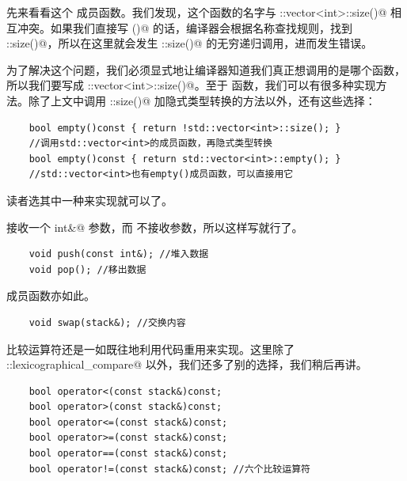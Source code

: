 先来看看这个 \lstinline@size@ 成员函数。我们发现，这个函数的名字与 \lstinline@std::vector<int>::size()@ 相互冲突。如果我们直接写 \lstinline@size()@ 的话，编译器会根据名称查找规则，找到 \lstinline@stack::size()@，所以在这里就会发生 \lstinline@stack::size()@ 的无穷递归调用，进而发生错误。\par
为了解决这个问题，我们必须显式地让编译器知道我们真正想调用的是哪个函数，所以我们要写成 \lstinline@std::vector<int>::size()@。至于 \lstinline@empty@ 函数，我们可以有很多种实现方法。除了上文中调用 \lstinline@stack::size()@ 加隐式类型转换的方法以外，还有这些选择：
\begin{lstlisting}
    bool empty()const { return !std::vector<int>::size(); }
    //调用std::vector<int>的成员函数，再隐式类型转换
    bool empty()const { return std::vector<int>::empty(); }
    //std::vector<int>也有empty()成员函数，可以直接用它
\end{lstlisting}
读者选其中一种来实现就可以了。\par
\lstinline@push@ 接收一个 \lstinline@const int&@ 参数，而 \lstinline@pop@ 不接收参数，所以这样写就行了。
\begin{lstlisting}
    void push(const int&); //堆入数据
    void pop(); //移出数据
\end{lstlisting}\par
\lstinline@swap@ 成员函数亦如此。
\begin{lstlisting}
    void swap(stack&); //交换内容
\end{lstlisting}\par
比较运算符还是一如既往地利用代码重用来实现。这里除了 \lstinline@std::lexicographical_compare@ 以外，我们还多了别的选择，我们稍后再讲。
\begin{lstlisting}
    bool operator<(const stack&)const;
    bool operator>(const stack&)const;
    bool operator<=(const stack&)const;
    bool operator>=(const stack&)const;
    bool operator==(const stack&)const;
    bool operator!=(const stack&)const; //六个比较运算符
\end{lstlisting}\par
